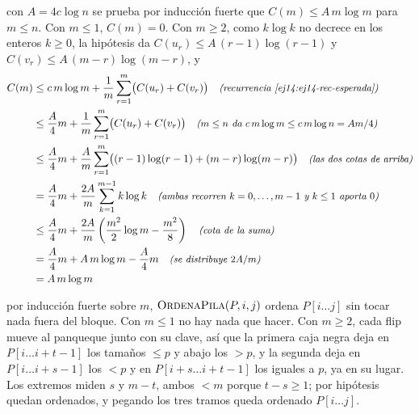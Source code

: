 \documentclass[11pt,letterpaper]{article}
\begin{document}
 con $A = 4c \log n$ se prueba por inducción fuerte
que $C(m) \le A\,m \log m$ para $m \le n$. Con $m \le 1$, $C(m) = 0$.
Con $m \ge 2$, como $k \log k$ no decrece en los enteros $k \ge 0$, la
hipótesis da $C(u_r) \le A\,(r-1) \log(r-1)$ y
$C(v_r) \le A\,(m-r) \log(m-r)$, y
\begin{align*}
  C(m) &\le c\,m \log m
          + \frac{1}{m} \sum_{r=1}^{m} \bigl(C(u_r) + C(v_r)\bigr)
          \quad\text{\small\itshape (recurrencia \eqref{ej14:ej14-rec-esperada})} \\
       &\le \frac{A}{4} m
          + \frac{1}{m} \sum_{r=1}^{m} \bigl(C(u_r) + C(v_r)\bigr)
          \quad\text{\small\itshape ($m \le n$ da $c\,m \log m \le c\,m \log n = Am/4$)} \\
       &\le \frac{A}{4} m + \frac{A}{m} \sum_{r=1}^{m}
            \bigl((r-1) \log(r-1) + (m-r) \log(m-r)\bigr)
          \quad\text{\small\itshape (las dos cotas de arriba)} \\
       &= \frac{A}{4} m + \frac{2A}{m} \sum_{k=1}^{m-1} k \log k
          \quad\text{\small\itshape (ambas recorren $k = 0, \dots, m-1$ y $k \le 1$ aporta $0$)} \\
       &\le \frac{A}{4} m + \frac{2A}{m}
            \left( \frac{m^{2}}{2} \log m - \frac{m^{2}}{8} \right)
          \quad\text{\small\itshape (cota de la suma)} \\
       &= \frac{A}{4} m + A\,m \log m - \frac{A}{4} m
          \quad\text{\small\itshape (se distribuye $2A/m$)} \\
       &= A\,m \log m
\end{align*}

 por inducción fuerte sobre $m$,
$\textsc{OrdenaPila}(P, i, j)$ ordena $P[i \ldots j]$ sin tocar nada
fuera del bloque. Con $m \le 1$ no hay nada que hacer. Con $m \ge 2$,
cada flip mueve al panqueque junto con su clave, así que la primera
caja negra deja en $P[i \ldots i+t-1]$ los tamaños $\le p$ y abajo los
$> p$, y la segunda deja en $P[i \ldots i+s-1]$ los $< p$ y en
$P[i+s \ldots i+t-1]$ los iguales a $p$, ya en su lugar. Los extremos
miden $s$ y $m - t$, ambos $< m$ porque $t - s \ge 1$; por hipótesis
quedan ordenados, y pegando los tres tramos queda ordenado
$P[i \ldots j]$.

\end{document}
